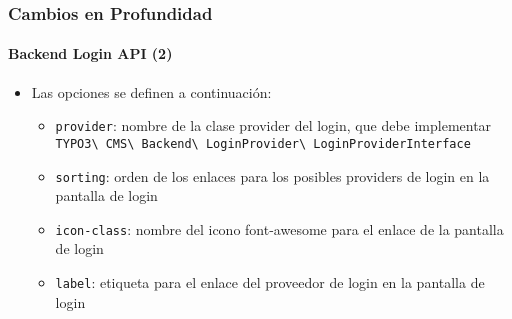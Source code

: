 \begin{frame}[fragile]
	\frametitle{Cambios en Profundidad}
	\framesubtitle{Backend Login API (2)}

	\begin{itemize}

		\item Las opciones se definen a continuación:

			\begin{itemize}

				\item \texttt{provider}:\newline
					nombre de la clase provider del login, que debe implementar
						\texttt{TYPO3\textbackslash
							CMS\textbackslash
							Backend\textbackslash
							LoginProvider\textbackslash
							LoginProviderInterface}

				\item \texttt{sorting}:\newline
					orden de los enlaces para los posibles providers de login en la pantalla de login

				\item \texttt{icon-class}:\newline
					nombre del icono font-awesome para el enlace de la pantalla de login

				\item \texttt{label}:\newline
					etiqueta para el enlace del proveedor de login en la pantalla de login
			\end{itemize}

	\end{itemize}

\end{frame}


